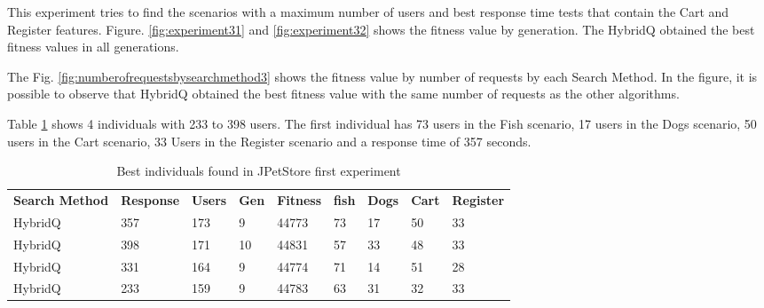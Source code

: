 \documentclass{bmcart}
\begin{document}
This experiment tries to find the scenarios with a maximum number of users and best response time tests that contain the Cart and Register features. Figure. \ref{fig:experiment31} and \ref{fig:experiment32} shows the fitness value by generation. The HybridQ obtained the best fitness values in all generations.



The Fig. \ref{fig:numberofrequestsbysearchmethod3} shows the fitness value by number of requests by each Search Method. In the figure, it is possible to observe that HybridQ obtained the best fitness value with the same number of requests as the other algorithms.



Table \ref{tab:bestindividuals3} shows 4 individuals with 233 to 398 users.  The first individual has 73 users in the Fish scenario, 17 users in the Dogs scenario, 50 users in  the Cart scenario, 33 Users in the Register scenario  and a response time of 357 seconds. 

\begin{table}[h!]
\centering
\caption{Best individuals found in JPetStore first experiment}
\label{tab:bestindividuals3}
\begin{tabular}{lllllllll}
\rowcolor[HTML]{C0C0C0} 
\textbf{Search Method} & \textbf{Response} & \textbf{Users} & \textbf{Gen} & \textbf{Fitness} & \textbf{fish} & \textbf{Dogs} & \textbf{Cart} & \textbf{Register} \\
HybridQ                & 357               & 173            & 9            & 44773            & 73             & 17            & 50            & 33                \\
HybridQ                & 398               & 171            & 10           & 44831            & 57             & 33            & 48            & 33                \\
HybridQ                & 331               & 164            & 9            & 44774            & 71             & 14            & 51            & 28                \\
HybridQ                & 233               & 159            & 9            & 44783            & 63             & 31            & 32            & 33               
\end{tabular}
\end{table}
\end{document}
